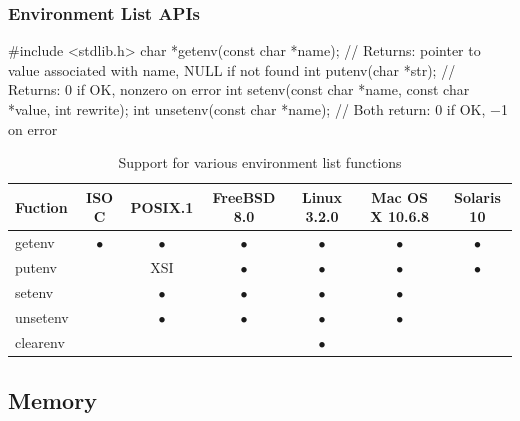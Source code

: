 \documentclass[newPxFont,sthlmFooter,nooffset]{beamer}
\begin{document}
\begin{frame}[containsverbatim,t]
  \frametitle{Environment List APIs}

\begin{codedef}
#include <stdlib.h>
char *getenv(const char *name);
// Returns: pointer to value associated with name, NULL if not found  
int putenv(char *str);
// Returns: 0 if OK, nonzero on error
int setenv(const char *name, const char *value, int rewrite); 
int unsetenv(const char *name);
// Both return: 0 if OK, −1 on error
\end{codedef}
{\footnotesize
\begin{table}[h]
  \centering
  \begin{tabular}{l | c c | *{4}{c}  }
    Fuction & ISO C & POSIX.1 & \parbox{5em}{\centering FreeBSD 8.0} & \parbox{5ex}{\centering Linux 3.2.0} & \parbox{5em}{\centering Mac OS X 10.6.8} & \parbox{5em}{\centering Solaris 10} \\ \hline \hline
    getenv  & $\bullet$ & $\bullet$ & $\bullet$ & $\bullet$ & $\bullet$ & $\bullet$ \\  
    putenv  &           &   XSI     & $\bullet$ & $\bullet$ & $\bullet$ & $\bullet$ \\  
    setenv  &           & $\bullet$ & $\bullet$ & $\bullet$ & $\bullet$ &           \\  
  unsetenv  &           & $\bullet$ & $\bullet$ & $\bullet$ & $\bullet$ &           \\  
  clearenv  &           &           &           & $\bullet$ &           &           \\
  \end{tabular}
  \caption{Support for various environment list functions}
  \label{tab:support}
\end{table}
}
\end{frame}


\subsection{Memory}
\end{document}
